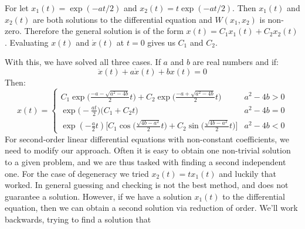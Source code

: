             \begin{bproof}
                For let $x_{1}(t)=\exp(-at/2)$ and
                $x_{2}(t)=t\exp(-at/2)$. Then $x_{1}(t)$ and
                $x_{2}(t)$ are both solutions to the
                differential equation and
                $W(x_{1},x_{2})$ is non-zero. Therefore the
                general solution is of the form
                $x(t)=C_{1}x_{1}(t)+C_{2}x_{2}(t)$. Evaluating
                $x(t)$ and $\dot{x}(t)$ at $t=0$ gives us
                $C_{1}$ and $C_{2}$.
            \end{bproof}
            With this, we have solved all three cases. If
            $a$ and $b$ are real numbers and if:
            \begin{equation*}
                \ddot{x}(t)+a\dot{x}(t)+bx(t)=0
            \end{equation*}
            Then:
            \begin{equation}
                \label{diffeq:gen_sol_to_sec_ord_lin_de_const_coeff}
                x(t)=
                \begin{cases}
                    C_{1}\exp
                    \big(\frac{-a-\sqrt{a^{2}-4b}}{2}t\big)+
                    C_{2}\exp\big(\frac{-a+\sqrt{a^{2}-4b}}{2}t\big)
                    &a^{2}-4b>0\\[2ex]
                    \exp\big(-\frac{at}{2}\big)
                    \big(C_{1}+C_{2}t\big)&a^{2}-4b=0\\[2ex]
                    \exp(-\frac{a}{2}t)\Big[
                    C_{1}\cos\big(\frac{\sqrt{4b-a^{2}}}{2}t\big)+
                    C_{2}\sin\big(\frac{\sqrt{4b-a^{2}}}{2}t\big)
                    \Big]&a^{2}-4b<0
                \end{cases}
            \end{equation}
            For second-order linear differential equations
            with non-constant coefficients, we need to modify
            our approach. Often it is easy to obtain
            one non-trivial solution to a given problem,
            and we are thus tasked with
            finding a second independent one. For the case of
            degeneracy we tried $x_{2}(t)=tx_{1}(t)$ and luckily
            that worked. In general guessing and checking is
            not the best method, and does not guarantee a
            solution. However, if we have a solution
            $x_{1}(t)$ to the differential equation, then we
            can obtain a second solution via reduction of order.
            We'll work backwards, trying to find a solution that
